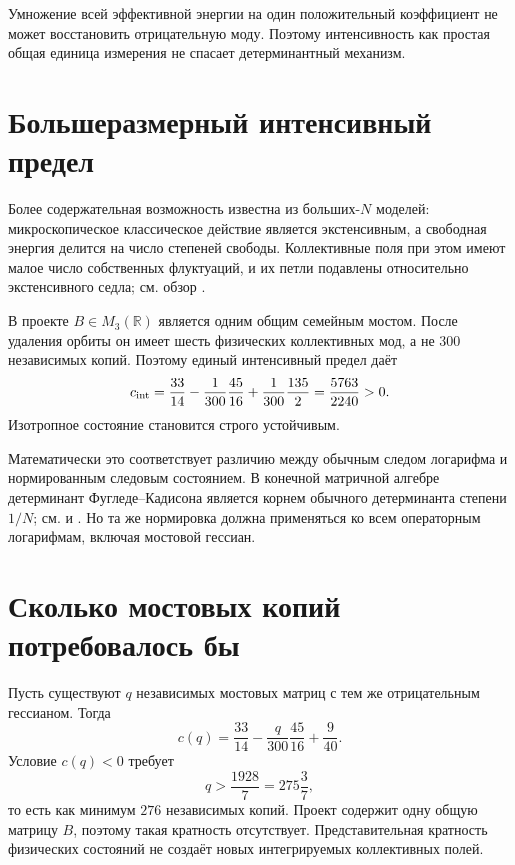 \begin{proposition}
Умножение всей эффективной энергии на один положительный коэффициент не
может восстановить отрицательную моду. Поэтому интенсивность как простая
общая единица измерения не спасает детерминантный механизм.
\end{proposition}

\section{Большеразмерный интенсивный предел}

Более содержательная возможность известна из больших-$N$ моделей:
микроскопическое классическое действие является экстенсивным, а свободная
энергия делится на число степеней свободы. Коллективные поля при этом имеют
малое число собственных флуктуаций, и их петли подавлены относительно
экстенсивного седла; см. обзор .

В проекте $B\in M_3(\mathbb R)$ является одним общим семейным мостом. После
удаления орбиты он имеет шесть физических коллективных мод, а не 300
независимых копий. Поэтому единый интенсивный предел даёт
\begin{equation}
 c_{\rm int}
 =\frac{33}{14}
 -\frac1{300}\frac{45}{16}
 +\frac1{300}\frac{135}{2}
 =\frac{5763}{2240}>0.
 \label{eq:v6-common-intensive-large-rank-curvature}
\end{equation}
Изотропное состояние становится строго устойчивым.

Математически это соответствует различию между обычным следом логарифма
и нормированным следовым состоянием. В конечной матричной алгебре
детерминант Фугледе--Кадисона является корнем обычного детерминанта степени
$1/N$; см.  и . Но та же
нормировка должна применяться ко всем операторным логарифмам, включая
мостовой гессиан.

\section{Сколько мостовых копий потребовалось бы}

Пусть существуют $q$ независимых мостовых матриц с тем же отрицательным
гессианом. Тогда
\begin{equation}
 c(q)=\frac{33}{14}
 -\frac{q}{300}\frac{45}{16}
 +\frac9{40}.
\end{equation}
Условие $c(q)<0$ требует
\begin{equation}
 q>\frac{1928}{7}=275\frac37,
\end{equation}
то есть как минимум $276$ независимых копий. Проект содержит одну общую
матрицу $B$, поэтому такая кратность отсутствует. Представительная
кратность физических состояний не создаёт новых интегрируемых
коллективных полей.

